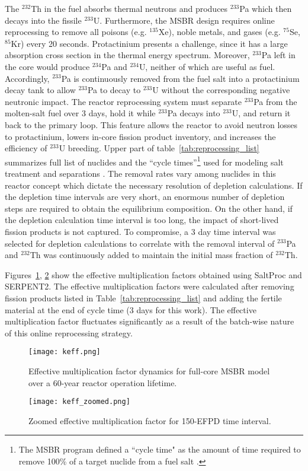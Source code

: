 The $^{232}$Th in the fuel absorbs thermal neutrons and produces $^{233}$Pa 
which then decays into the fissile $^{233}$U. Furthermore, the \gls{MSBR} 
design requires online reprocessing to remove all poisons (e.g. $^{135}$Xe), 
noble metals, and gases (e.g. $^{75}$Se, $^{85}$Kr) every 20 seconds. 
Protactinium presents a challenge, since it has a large absorption cross 
section in the thermal energy spectrum. Moreover, $^{233}$Pa left in the core
would produce $^{234}$Pa and $^{234}$U, neither of which are useful as fuel. 
Accordingly, $^{233}$Pa is continuously 
removed from the fuel salt into a protactinium decay tank to allow $^{233}$Pa 
to decay to $^{233}$U without the corresponding negative neutronic impact. The reactor 
reprocessing system must separate $^{233}$Pa from the molten-salt fuel over 3 
days, hold it while $^{233}$Pa decays into $^{233}$U, and return it back to the 
primary loop. This feature allows the reactor to avoid neutron losses to 
protactinium, lowers in-core fission product inventory, and increases the 
efficiency of $^{233}$U breeding. Upper part of table~\ref{tab:reprocessing_list} 
summarizes full list of nuclides and the ``cycle times''\footnote{ The \gls{MSBR} 
program defined a ``cycle time" as the amount of time required to remove 100\% of 
a target nuclide from a fuel 
salt \cite{robertson_conceptual_1971}.} used for modeling salt treatment and 
separations \cite{robertson_conceptual_1971}. 
The removal rates vary among nuclides in this reactor concept which dictate the 
necessary resolution of depletion calculations. If the depletion time intervals 
are very short, an enormous number of depletion steps are required to obtain 
the equilibrium composition. On the other hand, if the depletion  calculation 
time interval is too long, the impact of short-lived fission products is not 
captured. To compromise, a 3 day time interval was selected for depletion 
calculations to correlate with the removal interval of 
$^{233}$Pa and $^{232}$Th was continuously added to maintain the initial mass 
fraction of $^{232}$Th.

Figures~\ref{fig:keff}, \ref{fig:keff_zoomed} show the effective multiplication factors 
obtained using SaltProc and SERPENT2. The effective multiplication factors were 
calculated after removing fission products listed in 
Table~\ref{tab:reprocessing_list} and adding the fertile material at the end of 
cycle time (3 days for this work). The effective multiplication 
factor fluctuates significantly as a result of the batch-wise nature of this 
online reprocessing strategy. 
\begin{figure}[ht!] 
  \centering
  \texttt{[image: keff.png]}
  \caption{Effective multiplication factor dynamics for full-core \gls{MSBR} 
  model over a 60-year reactor operation lifetime.}
  \label{fig:keff}
\end{figure}
\begin{figure}[ht!] 
  \centering
  \texttt{[image: keff\_zoomed.png]}
  \caption{Zoomed effective multiplication factor for 150-EFPD time interval.}
  \label{fig:keff_zoomed}
\end{figure}

